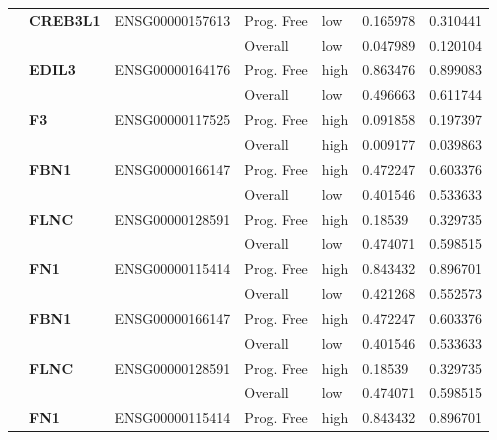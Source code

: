 \begin{spacing}{1}
{\begin{longtable}{|>{\bfseries}p{2cm}|>{\bfseries}p{1.9cm}|p{2.8cm}|p{2cm}|p{2cm}|p{1.5cm}|p{1.5cm}|}
            \hhline{~======}
             & CREB3L1  & ENSG00000157613 & Prog. Free & low  & 0.165978 & 0.310441 \\
            \hhline{~~~----}
             &          &                 & Overall    & low  & 0.047989 & 0.120104 \\
            \hhline{~======}
             & EDIL3    & ENSG00000164176 & Prog. Free & high & 0.863476 & 0.899083 \\
            \hhline{~~~----}
             &          &                 & Overall    & low  & 0.496663 & 0.611744 \\
            \hhline{~======}
             & F3       & ENSG00000117525 & Prog. Free & high & 0.091858 & 0.197397 \\
            \hhline{~~~----}
             &          &                 & Overall    & high & 0.009177 & 0.039863 \\
            \hhline{~======}
             & FBN1     & ENSG00000166147 & Prog. Free & high & 0.472247 & 0.603376 \\
            \hhline{~~~----}
             &          &                 & Overall    & low  & 0.401546 & 0.533633 \\
            \hhline{~======}
             & FLNC     & ENSG00000128591 & Prog. Free & high & 0.18539  & 0.329735 \\
            \hhline{~~~----}
             &          &                 & Overall    & low  & 0.474071 & 0.598515 \\
            \hhline{~======}
             & FN1      & ENSG00000115414 & Prog. Free & high & 0.843432 & 0.896701 \\
            \hhline{~~~----}
             &          &                 & Overall    & low  & 0.421268 & 0.552573 \\
            \hhline{~======}
             & FBN1     & ENSG00000166147 & Prog. Free & high & 0.472247 & 0.603376 \\
            \hhline{~~~----}
             &          &                 & Overall    & low  & 0.401546 & 0.533633 \\
            \hhline{~======}
             & FLNC     & ENSG00000128591 & Prog. Free & high & 0.18539  & 0.329735 \\
            \hhline{~~~----}
             &          &                 & Overall    & low  & 0.474071 & 0.598515 \\
            \hhline{~======}
             & FN1      & ENSG00000115414 & Prog. Free & high & 0.843432 & 0.896701 \\

\end{longtable}}
\end{spacing}
